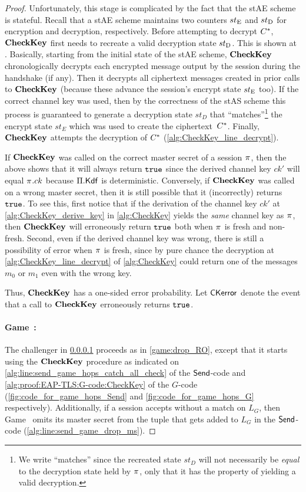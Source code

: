 \begin{proof}
Unfortunately,
this stage is complicated by the fact that the stAE scheme is stateful.
Recall that a stAE scheme maintains two counters $st_{\mathrm{E}}$ and  $st_{\mathrm{D}}$ for encryption and decryption,
respectively.
Before attempting to decrypt $C^*$,
$\mathbf{CheckKey}$ first needs to recreate a valid decryption state $st_{\mathrm{D}}$.
This is shown at .
Basically,
starting from the initial state of the stAE scheme,
$\mathbf{CheckKey}$ chronologically decrypts each encrypted message output by the session during the handshake (if any).
Then it decrypts all ciphertext messages created in prior calls to $\mathbf{CheckKey}$  
(because these advance the session's encrypt state $st_{\mathrm{E}}$ too).
If the correct channel key was used,
then by the correctness of the stAS scheme this process is guaranteed to generate a decryption state $st_D$ that ``matches''\footnote{We write ``matches'' since the recreated state $st_D$ will not necessarily be \emph{equal} to the decryption state held by $\oracle$, only that it has the property of yielding a valid decryption.}
the encrypt state $st_E$ which was used to create the ciphertext~$C^*$. 
Finally, $\mathbf{CheckKey}$ attempts the decryption of $C^*$ (\cref{alg:CheckKey_line_decrypt}).   


If $\mathbf{CheckKey}$ was called on the correct master secret of a session $\oracle$,
then the above shows that it will always return $\mathtt{true}$ since the derived channel key $ck'$ will equal $\oracle.ck$ because  $\mathrm{\Pi}.\mathsf{Kdf}$ is deterministic.
Conversely,
if $\mathbf{CheckKey}$ was called on a wrong master secret, then it is still possible that it (incorrectly) returns $\mathtt{true}$.
To see this,
first notice that if the derivation of the channel key $ck'$ at \cref{alg:CheckKey_derive_key} in \cref{alg:CheckKey} yields the \emph{same} channel key as $\oracle$,
then $\mathbf{CheckKey}$ will erroneously return $\mathtt{true}$ both when $\oracle$ is fresh and non-fresh.
Second,
even if the derived channel key was wrong,
there is still a possibility of error when $\oracle$ is fresh,
since by pure chance the decryption at \cref{alg:CheckKey_line_decrypt} of \cref{alg:CheckKey} could return one of the messages $m_0$ or $m_1$ even with the wrong key.

Thus,
$\mathbf{CheckKey}$ has a one-sided error probability.
Let $\mathsf{CKerror}$ denote the event that a call to $\mathbf{CheckKey}$ erroneously returns $\mathtt{true}$.


\newgame
\paragraph{Game~\game:} \label{game:remove_code_send} 
The challenger in \cref{game:remove_code_send} proceeds as in \cref{game:drop_RO},
except that it starts using the $\mathbf{CheckKey}$ procedure as indicated on \cref{alg:line:send_game_hops_catch_all_check} of the $\mathsf{Send}$-code and \cref{alg:proof:EAP-TLS:G-code:CheckKey} of the $G$-code
(\cref{fig:code_for_game_hops_Send} and \cref{fig:code_for_game_hops_G} respectively).
Additionally,
if a session accepts without a match on $L_G$,
then Game~\game{} omits its master secret from the tuple that gets added to $L_G$ in the $\mathsf{Send}$-code (\cref{alg:line:send_game_drop_ms}).


\end{proof}
